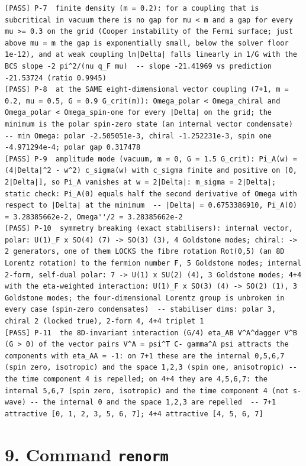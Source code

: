 \documentclass[
  10pt,
]{article}
\begin{document}
\begin{verbatim}
[PASS] P-7  finite density (m = 0.2): for a coupling that is subcritical in vacuum there is no gap for mu < m and a gap for every mu >= 0.3 on the grid (Cooper instability of the Fermi surface; just above mu = m the gap is exponentially small, below the solver floor 1e-12), and at weak coupling ln|Delta| falls linearly in 1/G with the BCS slope -2 pi^2/(nu q_F mu)  -- slope -21.41969 vs prediction -21.53724 (ratio 0.9945)
[PASS] P-8  at the SAME eight-dimensional vector coupling (7+1, m = 0.2, mu = 0.5, G = 0.9 G_crit(m)): Omega_polar < Omega_chiral and Omega_polar < Omega_spin-one for every |Delta| on the grid; the minimum is the polar spin-zero state (an internal vector condensate)  -- min Omega: polar -2.505051e-3, chiral -1.252231e-3, spin one -4.971294e-4; polar gap 0.317478
[PASS] P-9  amplitude mode (vacuum, m = 0, G = 1.5 G_crit): Pi_A(w) = (4|Delta|^2 - w^2) c_sigma(w) with c_sigma finite and positive on [0, 2|Delta|], so Pi_A vanishes at w = 2|Delta|: m_sigma = 2|Delta|; static check: Pi_A(0) equals half the second derivative of Omega with respect to |Delta| at the minimum  -- |Delta| = 0.6753386910, Pi_A(0) = 3.28385662e-2, Omega''/2 = 3.28385662e-2
[PASS] P-10  symmetry breaking (exact stabilisers): internal vector, polar: U(1)_F x SO(4) (7) -> SO(3) (3), 4 Goldstone modes; chiral: -> 2 generators, one of them LOCKS the fibre rotation Rot(0,5) (an 8D Lorentz rotation) to the fermion number F, 5 Goldstone modes; internal 2-form, self-dual polar: 7 -> U(1) x SU(2) (4), 3 Goldstone modes; 4+4 with the eta-weighted interaction: U(1)_F x SO(3) (4) -> SO(2) (1), 3 Goldstone modes; the four-dimensional Lorentz group is unbroken in every case (spin-zero condensates)  -- stabiliser dims: polar 3, chiral 2 (locked true), 2-form 4, 4+4 triplet 1
[PASS] P-11  the 8D-invariant interaction (G/4) eta_AB V^A^dagger V^B (G > 0) of the vector pairs V^A = psi^T C- gamma^A psi attracts the components with eta_AA = -1: on 7+1 these are the internal 0,5,6,7 (spin zero, isotropic) and the space 1,2,3 (spin one, anisotropic) -- the time component 4 is repelled; on 4+4 they are 4,5,6,7: the internal 5,6,7 (spin zero, isotropic) and the time component 4 (not s-wave) -- the internal 0 and the space 1,2,3 are repelled  -- 7+1 attractive [0, 1, 2, 3, 5, 6, 7]; 4+4 attractive [4, 5, 6, 7]
\end{verbatim}

\hypertarget{command-renorm}{%
\section{\texorpdfstring{9. Command
\texttt{renorm}}{9. Command renorm}}\label{command-renorm}}
\end{document}

